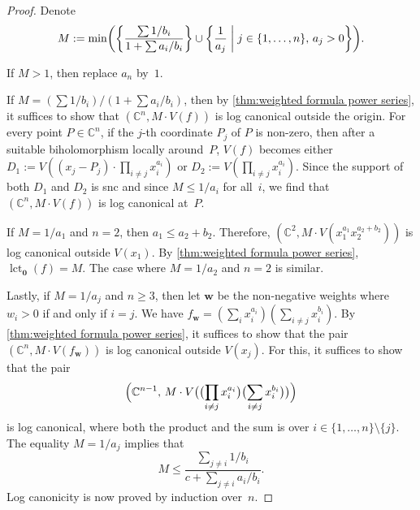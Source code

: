 \documentclass[a4paper, 12pt, oneside]{article}
\theoremstyle{plain}
\theoremstyle{definition}
\theoremstyle{remark}
\numberwithin{theorem}{section}
\numberwithin{table}{section}
\numberwithin{equation}{theorem}
\begin{document}
\begin{proof}
Denote
\[
M := \min\mleft(\mleft\{\frac{\sum 1/b_i}{1 + \sum a_i/b_i}\mright\} \cup \mleft\{ \frac{1}{a_j} \;\middle|\; j \in \{1, \ldots, n\},\, a_j > 0 \mright\}\mright).
\]

If $M > 1$, then replace $a_n$ by~$1$.

If $M = (\sum 1/b_i)/(1 + \sum a_i/b_i)$, then by \cref{thm:weighted formula power series}, it suffices to show that $(\mathbb C^n, M \cdot V(f))$ is log canonical outside the origin. For every point $P \in \mathbb C^n$, if the $j$-th coordinate $P_j$ of $P$ is non-zero, then after a suitable biholomorphism locally around~$P$, $V(f)$ becomes either $D_1 := V((x_j - P_j) \cdot \prod_{i \neq j} x_i^{a_i})$ or $D_2 := V(\prod_{i \neq j} x_i^{a_i})$. Since the support of both $D_1$ and $D_2$ is snc and since $M \leq 1/a_i$ for all~$i$, we find that $(\mathbb C^n, M \cdot V(f))$ is log canonical at~$P$.

If $M = 1/a_1$ and $n = 2$, then $a_1 \leq a_2 + b_2$.
Therefore, $(\mathbb C^2, M \cdot V(x_1^{a_1} x_2^{a_2 + b_2}))$ is log canonical outside $V(x_1)$. By \cref{thm:weighted formula power series}, $\operatorname{lct}_{\bm 0}(f) = M$. The case where $M = 1/a_2$ and $n = 2$ is similar.

Lastly, if $M = 1/a_j$ and $n \geq 3$, then let $\bm w$ be the non-negative weights where $w_i > 0$ if and only if $i = j$. We have $f_{\bm w} = (\sum_i x_i^{a_i}) (\sum_{i \neq j} x_i^{b_i})$. By \cref{thm:weighted formula power series}, it suffices to show that the pair $(\mathbb C^n, M \cdot V(f_{\bm w}))$ is log canonical outside $V(x_j)$. For this, it suffices to show that the pair
\[
\Bigl(\mathbb C^{n-1},\, M \cdot V\bigl( \bigl(\prod_{i \neq j} x_i^{a_i}\bigr) \bigl(\sum_{i \neq j} x_i^{b_i}\bigr) \bigr)\Bigr)
\]
is log canonical, where both the product and the sum is over $i \in \{1, \ldots, n\} \setminus \{j\}$. The equality $M = 1/a_j$ implies that
\[
M \leq \frac{\sum_{j\neq i} 1/b_i}{c + \sum_{j\neq i} a_i/b_i}.
\]
Log canonicity is now proved by induction over~$n$.
\end{proof}
\end{document}
